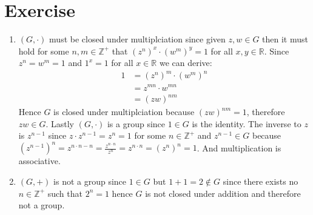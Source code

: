 \documentclass{article}
\begin{document}
\section{Exercise}
\begin{enumerate}[label=(\alph*)]
    \item $(G, \cdot)$ must be closed under multiplciation since given
    $z, w \in G$ then it must hold for some $n, m \in \mathbb{Z}^+$ that
    $(z^n)^x \cdot (w^m)^y = 1$ for all $x, y \in \mathbb{R}$. Since $z^n = w^m
    = 1$ and $1^x = 1$ for all $x \in \mathbb{R}$ we can derive:
    \begin{align*}
        1 &= \left(z^n\right)^m \cdot \left(w^m\right)^n \\
        &= z^{mn} \cdot w^{mn} \\
        &= \left(zw\right)^{nm} 
    \end{align*}
    Hence $G$ is closed under multiplciation because $\left(zw\right)^{nm} = 1$,
    therefore $zw \in G$. Lastly $(G, \cdot)$ is a group since $1 \in G$ is the
    identity. The inverse to $z$ is $z^{n - 1}$ since $z \cdot z^{n - 1} = z^n =
    1$ for some $n \in \mathbb{Z}^+$ and $z^{n - 1} \in G$ because $(z^{n -
    1})^n = z^{n \cdot n - n} = \frac{z^{n \cdot n}}{z^n} = z^{n \cdot n} = (z^{n})^n = 1$. And multiplication is associative.
    \item  $(G, +)$ is not a group since $1 \in G$ but $1 + 1 = 2 \notin G$
    since there exists no $n \in \mathbb{Z}^+$ such that $2^n = 1$ hence $G$ is
    not closed under addition and therefore not a group.
\end{enumerate}
\end{document}
